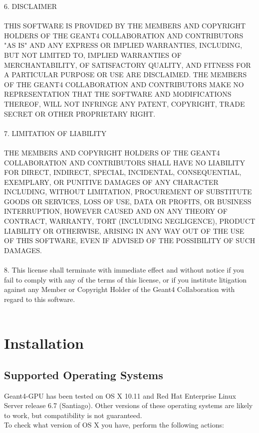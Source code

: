 \documentclass[12pt]{article}
\begin{document}
 
6. DISCLAIMER\\
 \\
THIS SOFTWARE IS PROVIDED BY THE MEMBERS AND COPYRIGHT HOLDERS OF THE GEANT4 COLLABORATION AND CONTRIBUTORS "AS IS" AND ANY EXPRESS OR IMPLIED WARRANTIES, INCLUDING, BUT NOT LIMITED TO, IMPLIED WARRANTIES OF MERCHANTABILITY, OF SATISFACTORY QUALITY, AND FITNESS FOR A PARTICULAR PURPOSE OR USE ARE DISCLAIMED. THE MEMBERS OF THE GEANT4 COLLABORATION AND CONTRIBUTORS MAKE NO REPRESENTATION THAT THE SOFTWARE AND MODIFICATIONS THEREOF, WILL NOT INFRINGE ANY PATENT, COPYRIGHT, TRADE SECRET OR OTHER PROPRIETARY RIGHT.\\
 \\
7. LIMITATION OF LIABILITY\\
 \\
THE MEMBERS AND COPYRIGHT HOLDERS OF THE GEANT4 COLLABORATION AND CONTRIBUTORS SHALL HAVE NO LIABILITY FOR DIRECT, INDIRECT, SPECIAL, INCIDENTAL, CONSEQUENTIAL, EXEMPLARY, OR PUNITIVE DAMAGES OF ANY CHARACTER INCLUDING, WITHOUT LIMITATION, PROCUREMENT OF SUBSTITUTE GOODS OR SERVICES, LOSS OF USE, DATA OR PROFITS, OR BUSINESS INTERRUPTION, HOWEVER CAUSED AND ON ANY THEORY OF CONTRACT, WARRANTY, TORT (INCLUDING NEGLIGENCE), PRODUCT LIABILITY OR OTHERWISE, ARISING IN ANY WAY OUT OF THE USE OF THIS SOFTWARE, EVEN IF ADVISED OF THE POSSIBILITY OF SUCH DAMAGES.\\
 \\
8. This license shall terminate with immediate effect and without notice if you fail to comply with any of the terms of this license, or if you institute litigation against any Member or Copyright Holder of the Geant4 Collaboration with regard to this software.\\
 \\
 
\section{Installation} %

\subsection{Supported Operating Systems} %
Geant4-GPU has been tested on OS X 10.11 and Red Hat Enterprise Linux Server release 6.7 (Santiago). Other versions of these operating systems are likely to work, but compatibility is not guaranteed.\\

To check what version of OS X you have, perform the following actions:
\end{document}
